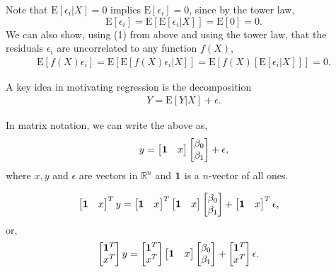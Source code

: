 \documentclass{amsart}
\theoremstyle{plain}
\numberwithin{equation}{section}
\begin{document}
Note that $\mathrm{E}[\epsilon_i|X] = 0$ implies $\mathrm{E}[\epsilon_i]=0$,
since by the tower law,
$$\mathrm{E}[\epsilon_i] = \mathrm{E}[\mathrm{E}[\epsilon_i|X]] = \mathrm{E}[0]=0.$$
We can also show, using (1) from above and using the tower law, that the residuals
$\epsilon_i$ are uncorrelated to any 
function $f(X)$,
\begin{align*}
\mathrm{E}[f(X)\epsilon_i] = \mathrm{E}[\mathrm{E}[f(X)\epsilon_i|X]] = \mathrm{E}[f(X)[\mathrm{E}[\epsilon_i|X]]]=0.
\end{align*}

A key idea in motivating regression is the decomposition
\begin{align*}
Y = \mathrm{E}[Y|X] + \epsilon.
\end{align*}

In matrix notation, we can write the above as,
\begin{align*}
y = \begin{bmatrix}
{\bf 1} & x
\end{bmatrix}
\begin{bmatrix}
\beta_0\\
\beta_1
\end{bmatrix} + \epsilon,
\end{align*}
where $x, y$ and $\epsilon$ are vectors in $\mathbb{R}^n$ and 
${\bf 1}$ is a $n$-vector of all ones.

\begin{align*}
\begin{bmatrix}
{\bf 1} & x
\end{bmatrix}^T
y &= 
\begin{bmatrix}
{\bf 1} & x
\end{bmatrix}^T
\begin{bmatrix}
{\bf 1} & x
\end{bmatrix}
\begin{bmatrix}
\beta_0\\
\beta_1
\end{bmatrix} + 
\begin{bmatrix}
{\bf 1} & x
\end{bmatrix}^T\epsilon,
\end{align*}
or,
\begin{align*}
\begin{bmatrix}
{\bf 1}^T\\
x^T
\end{bmatrix}
y &= 
\begin{bmatrix}
{\bf 1}^T\\
x^T
\end{bmatrix}
\begin{bmatrix}
{\bf 1} & x
\end{bmatrix}
\begin{bmatrix}
\beta_0\\
\beta_1
\end{bmatrix} + 
\begin{bmatrix}
{\bf 1}^T\\
x^T
\end{bmatrix}\epsilon.
\end{align*}
\end{document}

